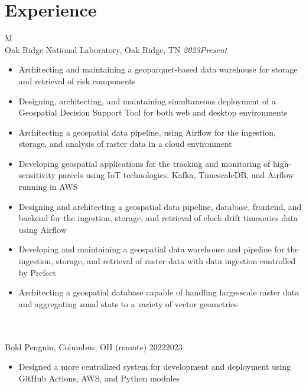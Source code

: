 \documentclass[10pt]{article}%
\begin{document}
    \section*{\faCalendar{} Experience}
    \begin{tabularx}{\linewidth}{M}%
         \\
        Oak Ridge National Laboratory, Oak Ridge, TN \textit{2023\textemdash{}Present} \\
        \begin{itemize}[topsep=-12pt,parsep=0em]
            \setlength\itemsep{0em}
            \item Architecting and maintaining a geoparquet-based data warehouse for storage and retrieval of risk components %
            \item Designing, architecting, and maintaining simultaneous deployment of a Geospatial Decision Support Tool for both web and desktop environments %
            \item Architecting a geospatial data pipeline, using Airflow for the ingestion, storage, and analysis of raster data in a cloud environment %
            \item Developing geospatial applications for the tracking and monitoring of high-sensitivity parcels using IoT technologies, Kafka, TimescaleDB, and Airflow running in AWS %
            \item Designing and architecting a geospatial data pipeline, database, frontend, and backend for the ingestion, storage, and retrieval of clock drift timeseries data using Airflow %
            \item Developing and maintaining a geospatial data warehouse and pipeline for the ingestion, storage, and retrieval of raster data with data ingestion controlled by Prefect %
            \item Architecting a geospatial database capable of handling large-scale raster data and aggregating zonal stats to a variety of vector geometries %
        \end{itemize} \\
         \\
        Bold Penguin, Columbus, OH (remote) 2022\textemdash{}2023 \\
        \begin{itemize}[topsep=-12pt,parsep=0em]
            \setlength\itemsep{0em}
            \item Designed a more centralized system for development and deployment using GitHub Actions, AWS, and Python modules %

\end{itemize}
\end{tabularx}
\end{document}
